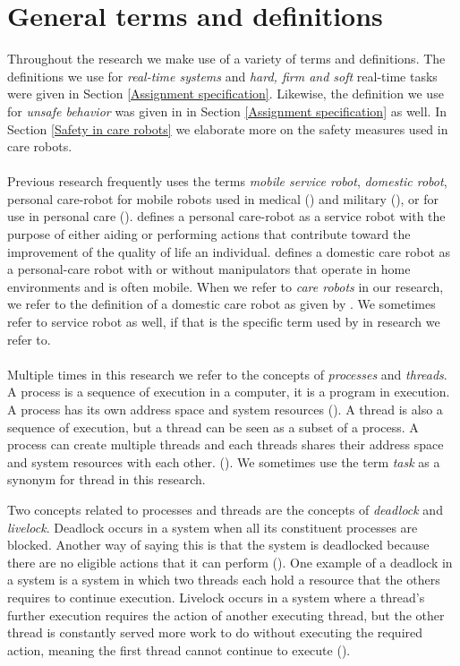 \documentclass[12pt]{scrreprt}
\begin{document}
\section{General terms and definitions}
\label{Terms and defintions}
Throughout the research we make use of a variety of terms and definitions. The definitions we use for \textit{real-time systems} and \textit{hard, firm and soft} real-time tasks were given in Section \ref{Assignment specification}. Likewise, the definition we use for \textit{unsafe behavior} was given in in Section \ref{Assignment specification} as well. In Section \ref{Safety in care robots} we elaborate more on the safety measures used in care robots.
\\\\
Previous research frequently uses the terms \textit{mobile service robot}, \textit{domestic robot}, personal care-robot for mobile robots used in medical (\cite{medical}) and military (\cite{military}), or for use in personal care (\cite{personal}). \citeauthor{tadele} defines a personal care-robot as a service robot with the purpose of either aiding or performing actions that contribute toward the improvement of the quality of life an individual. \citeauthor{tadele} defines a domestic care robot as a personal-care robot with or without manipulators that operate in home environments and is often mobile. When we refer to \textit{care robots} in our research, we refer to the definition of a domestic care robot as given by \citeauthor{tadele}. We sometimes refer to service robot as well, if that is the specific term used by in research we refer to.
\\\\
Multiple times in this research we refer to the concepts of \textit{processes} and \textit{threads}. A process is a sequence of execution in a computer, it is a program in execution. A process has its own address space and system resources (\cite{process_threads}). A thread is also a sequence of execution, but a thread can be seen as a subset of a process. A process can create multiple threads and each threads shares their address space and system resources with each other. (\cite{process_threads}). We sometimes use the term \textit{task} as a synonym for thread in this research.
\par
Two concepts related to processes and threads are the concepts of \textit{deadlock} and \textit{livelock}. Deadlock occurs in a system when all its constituent processes are blocked. Another way of saying this is that the system is deadlocked because there are no eligible actions that it can perform (\cite{ltsa}). One example of a deadlock in a system is a system in which two threads each hold a resource that the others requires to continue execution. Livelock occurs in a system where a thread's further execution requires the action of another executing thread, but the other thread is constantly served more work to do without executing the required action, meaning the first thread cannot continue to execute (\cite{livelock_starvation}).
\end{document}
